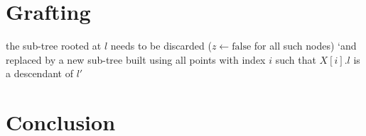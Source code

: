 \documentclass[12pt,letterpaper]{article}
\begin{document}
\section{Grafting}
\label{Grafting}

the sub-tree rooted at \(l\) needs to be discarded (\(z \leftarrow
\mathrm{false}\) for all such nodes) `and replaced by a
new sub-tree built using all points with index \(i\) such that \(X[i].l\) is a descendant of
\(l'\)

\section{Conclusion}

\TBC



\end{document}
